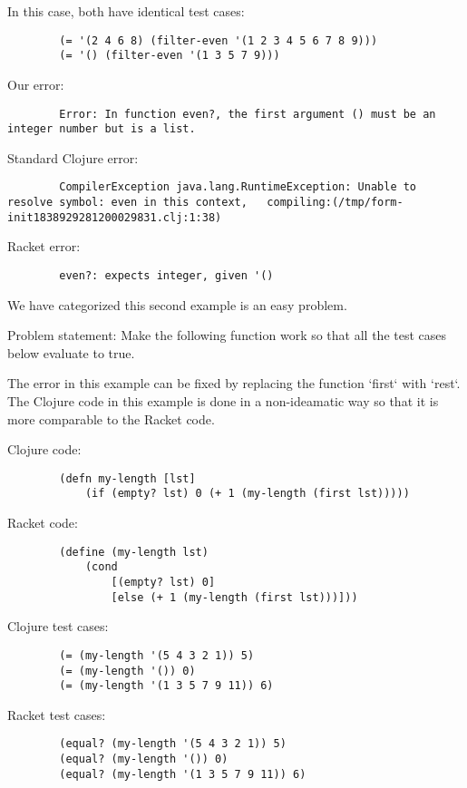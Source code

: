 \documentclass[12pt]{article}
\begin{document}
	In this case, both have identical test cases: 
	\begin{verbatim}
		(= '(2 4 6 8) (filter-even '(1 2 3 4 5 6 7 8 9)))
		(= '() (filter-even '(1 3 5 7 9)))
	\end{verbatim}

	Our error:
	\begin{verbatim}
		Error: In function even?, the first argument () must be an integer number but is a list.
	\end{verbatim}

	Standard Clojure error:
	\begin{verbatim}
		CompilerException java.lang.RuntimeException: Unable to resolve symbol: even in this context, 	compiling:(/tmp/form-init1838929281200029831.clj:1:38) 
	\end{verbatim}

	Racket error:
	\begin{verbatim}
		even?: expects integer, given '()
	\end{verbatim}


	We have categorized this second example is an easy problem.

	Problem statement:
		Make the following function work so that all the test cases below evaluate to true. 
		
	The error in this example can be fixed by replacing the function `first` with `rest`.
	The Clojure code in this example is done in a non-ideamatic way so that it is more comparable to the Racket code.
		
	Clojure code:
	\begin{verbatim}
		(defn my-length [lst]
 			(if (empty? lst) 0 (+ 1 (my-length (first lst)))))
	\end{verbatim}
		
	Racket code:
	\begin{verbatim}
		(define (my-length lst)
  			(cond
 				[(empty? lst) 0]
   				[else (+ 1 (my-length (first lst)))]))
	\end{verbatim}
		
	Clojure test cases:
	\begin{verbatim}
		(= (my-length '(5 4 3 2 1)) 5)
		(= (my-length '()) 0)
		(= (my-length '(1 3 5 7 9 11)) 6)
	\end{verbatim}
	
	Racket test cases:
	\begin{verbatim}
		(equal? (my-length '(5 4 3 2 1)) 5)
		(equal? (my-length '()) 0)
		(equal? (my-length '(1 3 5 7 9 11)) 6)
	\end{verbatim}
	
\end{document}
